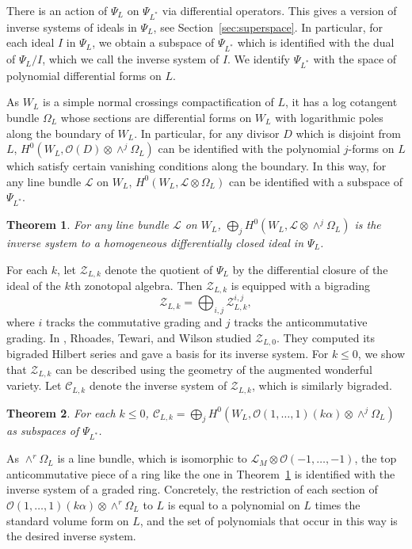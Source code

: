 \documentclass{amsart}
\newtheorem{theorem}{Theorem}[section]
\theoremstyle{definition}
\begin{document}
There is an action of $\Psi_L$ on $\Psi_{L^*}$ via differential operators. This gives a version of inverse systems of ideals in $\Psi_L$, see Section~\ref{sec:superspace}. In particular, for each ideal $I$ in $\Psi_L$, we obtain a subspace of $\Psi_{L^*}$ which is identified with the dual of $\Psi_L/I$, which we call the inverse system of $I$. We identify $\Psi_{L^*}$ with the space of polynomial differential forms on $L$. 

As $W_L$ is a simple normal crossings compactification of $L$, it has a log cotangent bundle $\Omega_L$ whose sections are differential forms on $W_L$ with logarithmic poles along the boundary of $W_L$. In particular, for any divisor $D$ which is disjoint from $L$, $H^0(W_L, \mathcal{O}(D) \otimes \wedge^j \Omega_L)$ can be identified with the polynomial $j$-forms on $L$ which satisfy certain vanishing conditions along the boundary. In this way, for any line bundle $\mathcal{L}$ on $W_L$, $H^0(W_L, \mathcal{L} \otimes \Omega_L)$ can be identified with a subspace of $\Psi_{L^*}$. 

\begin{theorem}\label{thm:diffclosed}
For any line bundle $\mathcal{L}$ on $W_L$, $\bigoplus_j H^0(W_L, \mathcal{L} \otimes \wedge^j \Omega_L)$ is the inverse system to a homogeneous differentially closed ideal in $\Psi_L$. 
\end{theorem}

For each $k$, let $\mathcal{Z}_{L, k}$ denote the quotient of $\Psi_L$ by the differential closure of the ideal of the $k$th zonotopal algebra. Then $\mathcal{Z}_{L, k}$ is equipped with a bigrading
$$\mathcal{Z}_{L, k} = \bigoplus_{i,j} \mathcal{Z}_{L, k}^{i,j},$$
where $i$ tracks the commutative grading and $j$ tracks the anticommutative grading. 
In \cite{Superspace}, Rhoades, Tewari, and Wilson studied $\mathcal{Z}_{L, 0}$. They computed its bigraded Hilbert series and gave a basis for its inverse system. For $k \le 0$, we show that $\mathcal{Z}_{L, k}$ can be described using the geometry of the augmented wonderful variety. Let $\mathcal{C}_{L, k}$ denote the inverse system of $\mathcal{Z}_{L, k}$, which is similarly bigraded. 

\begin{theorem}\label{thm:supersections}
For each $k \le 0$, $\mathcal{C}_{L,k} = \bigoplus_j H^0(W_L, \mathcal{O}(1, \dotsc, 1)(k\alpha) \otimes \wedge^j \Omega_L)$ as subspaces of $\Psi_{L^*}$. 
\end{theorem}

As $\wedge^r \Omega_L$ is a line bundle, which is isomorphic to $\mathcal{L}_M \otimes \mathcal{O}(-1, \dotsc, -1)$, the top anticommutative piece of a ring like the one in Theorem~\ref{thm:diffclosed} is identified with the inverse system of a graded ring. Concretely, the restriction of each section of $\mathcal{O}(1, \dotsc, 1)(k\alpha) \otimes \wedge^r \Omega_L$ to $L$ is equal to a polynomial on $L$ times the standard volume form on $L$, and the set of polynomials that occur in this way is the desired inverse system. 
\end{document}

